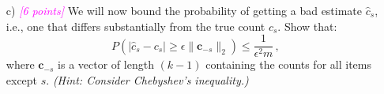 \documentclass{exam}
\newcommand{\grade}[1]{\small\textcolor{magenta}{\emph{[#1 points]}} \normalsize}
\newcommand{\sol}[1]{\ifshowsolutions{\leavevmode{\color{blue}Solution: #1}}\fi}
\newif\ifshowsolutions
\begin{document}
\begin{itemize}
\newpage
\item[{c)}] \grade{6} We will now bound the probability of getting a bad
  estimate $\hat{c}_s$, i.e., one that differs substantially from the true count $c_s$. Show that:
\[
P(|\hat{c}_s - c_s| \ge \epsilon \|\mathbf{c}_{-s}\|_2) \le \frac{1}{\epsilon^2 m}\, ,
\]
where $\mathbf{c}_{-s}$ is a vector of length $(k - 1)$ containing the counts for all items except $s$. \textit{(Hint: Consider Chebyshev's inequality.)} \\
\sol{
\begin{align*}
P(|\hat{c}_s - c_s| \ge \epsilon \|\mathbf{c}_{-s}\|^2_2) & \le \frac{Var(\hat{c}_s)}{\epsilon^2 \|\mathbf{c}_{-s}\|^2_2} \\ & = \frac{\|\mathbf{c}_{-s}\|^2_2}{\|\mathbf{c}_{-s}\|^2_2\epsilon^2 m} \\
& = \frac{1}{\epsilon^2 m}
\end{align*}
}

\end{itemize}
\end{document}
